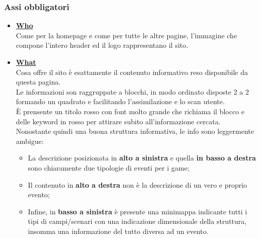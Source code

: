 \documentclass[../Relazione.tex]{subfiles}
\begin{document}
    \subsubsection{Assi obbligatori}
        \vspace*{0,5cm}
        \begin{itemize}
            \item \textbf{\underline{Who}}
            \vspace*{5mm}\\Come per la homepage e come per tutte le altre pagine, l'immagine che compone l'intero header ed il logo rappresentano il sito.
            \item \textbf{\underline{What}}
            \vspace*{5mm}\\Cosa offre il sito è esattamente il contenuto informativo reso disponibile da questa pagina.\\ Le informazioni son raggruppate a blocchi, in modo ordinato disposte 2 a 2 formando un quadrato e facilitando l'assimilazione e lo scan utente.\\
            È prensente un titolo rosso con font molto grande che richiama il blocco e delle keyword in rosso per attirare subito all'informazione cercata.\\
            Nonostante quindi una buona struttura informativa, le info sono leggermente ambigue:
            \begin{itemize}
                \item La descrizione posizionata in \textbf{alto a sinistra} e quella \textbf{in basso a destra} sono chiaramente due tipologie di eventi per i game;
                \item Il contenuto in \textbf{alto a destra} non è la descrizione di un vero e proprio evento;
                \item Infine, in \textbf{basso a sinistra} è presente una minimappa indicante tutti i tipi di campi/scenari con una indicazione dimensionale della struttura, insomma una informazione del tutto diversa ad un evento.
            \end{itemize}


\end{itemize}
\end{document}
